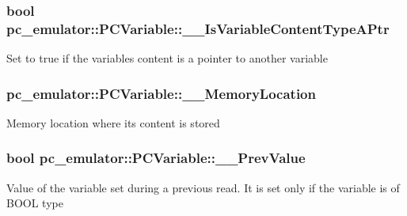 {\subsubsection[{\texorpdfstring{\+\_\+\+\_\+\+Is\+Variable\+Content\+Type\+A\+Ptr}{__IsVariableContentTypeAPtr}}]{\setlength{\rightskip}{0pt plus 5cm}bool pc\+\_\+emulator\+::\+P\+C\+Variable\+::\+\_\+\+\_\+\+Is\+Variable\+Content\+Type\+A\+Ptr}\hypertarget{classpc__emulator_1_1PCVariable_a3b2e04044a660a8f58ca660e5db60ae3}{}\label{classpc__emulator_1_1PCVariable_a3b2e04044a660a8f58ca660e5db60ae3}
Set to true if the variable\textquotesingle{}s content is a pointer to another variable 
\subsubsection[{\texorpdfstring{\+\_\+\+\_\+\+Memory\+Location}{__MemoryLocation}}]{ pc\+\_\+emulator\+::\+P\+C\+Variable\+::\+\_\+\+\_\+\+Memory\+Location}\hypertarget{classpc__emulator_1_1PCVariable_a24b16f945f808dada7e6633877a749c1}{}\label{classpc__emulator_1_1PCVariable_a24b16f945f808dada7e6633877a749c1}
Memory location where its content is stored 
\subsubsection[{\texorpdfstring{\+\_\+\+\_\+\+Prev\+Value}{__PrevValue}}]{\setlength{\rightskip}{0pt plus 5cm}bool pc\+\_\+emulator\+::\+P\+C\+Variable\+::\+\_\+\+\_\+\+Prev\+Value}\hypertarget{classpc__emulator_1_1PCVariable_ac3f4b918f17b9d2ee70d1a4aee8c3305}{}\label{classpc__emulator_1_1PCVariable_ac3f4b918f17b9d2ee70d1a4aee8c3305}
Value of the variable set during a previous read. It is set only if the variable is of B\+O\+OL type 
}
